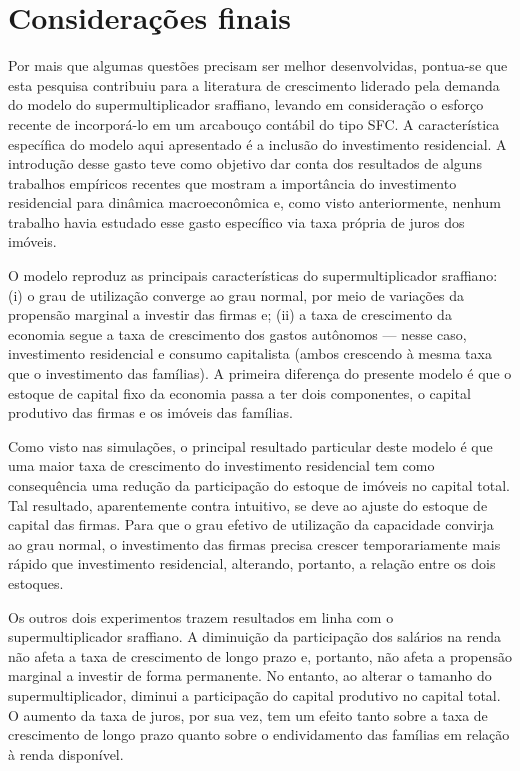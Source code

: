 \section{Considerações finais}\label{Conclusao_Modelo}

Por mais que algumas questões precisam ser melhor desenvolvidas, pontua-se que 
esta pesquisa contribuiu para a literatura de crescimento liderado pela demanda do modelo do supermultiplicador sraffiano, levando em consideração o esforço recente de incorporá-lo em um arcabouço contábil do tipo SFC.  A característica específica do modelo aqui apresentado é a inclusão do investimento residencial. A introdução desse gasto teve como objetivo dar conta dos resultados de alguns trabalhos empíricos recentes que mostram a importância do investimento residencial para dinâmica macroeconômica e, como visto anteriormente, nenhum trabalho havia estudado esse gasto específico via taxa própria de juros dos imóveis. 

O modelo reproduz as principais características do supermultiplicador sraffiano: (i) o grau de utilização converge ao grau normal, por meio de variações da propensão marginal a investir das firmas e; (ii) a taxa de crescimento da economia segue a taxa de crescimento dos gastos autônomos --- nesse caso, investimento residencial e consumo capitalista (ambos crescendo à mesma taxa que o investimento das famílias). A primeira diferença do  presente modelo é que o estoque de capital fixo da economia passa a ter dois componentes, o capital produtivo das firmas e os imóveis das famílias. 

Como visto nas simulações, o principal resultado particular deste modelo é que uma maior taxa de crescimento do investimento residencial tem como consequência uma redução da participação do estoque de imóveis no capital total. Tal resultado, aparentemente contra intuitivo, se deve ao ajuste do estoque de capital das firmas. Para que o grau efetivo de utilização da capacidade convirja ao grau normal, o investimento das firmas precisa crescer temporariamente mais rápido que investimento residencial, alterando, portanto, a relação entre os dois estoques. 

Os outros dois experimentos trazem resultados em linha com o supermultiplicador sraffiano. A diminuição da participação dos salários na renda não afeta a taxa de crescimento de longo prazo e, portanto, não afeta a propensão marginal a investir de forma permanente. No entanto, ao alterar o tamanho do supermultiplicador, diminui a participação do capital produtivo no capital total. O aumento da taxa de juros, por sua vez, tem um efeito tanto sobre a taxa de crescimento de longo prazo quanto sobre o endividamento das famílias em relação à renda disponível. 

